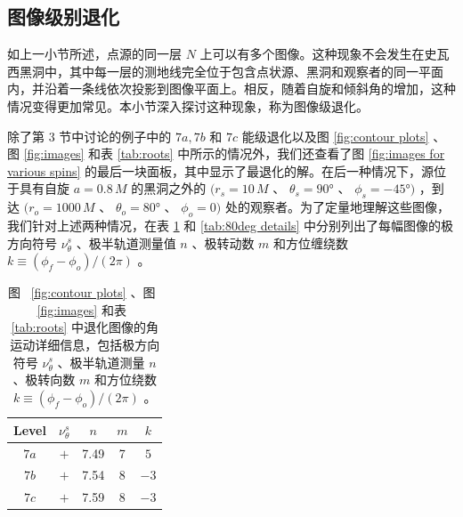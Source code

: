 \documentclass[aps,reprint,superscriptaddress,nofootinbib,floatfix,longbibliography,preprintnumbers]{revtex4-1}
\begin{document}
   \subsection{图像级别退化  }   
   \label{subsec:image degeneracy}     

如上一小节所述，点源的同一层    $N$    上可以有多个图像。这种现象不会发生在史瓦西黑洞中，其中每一层的测地线完全位于包含点状源、黑洞和观察者的同一平面内，并沿着一条线依次投影到图像平面上。相反，随着自旋和倾斜角的增加，这种情况变得更加常见。本小节深入探讨这种现象，称为图像级退化。  

除了第 3 节中讨论的例子中的    $7a, 7b$    和    $7c$    能级退化以及图    \ref{fig:contour plots}   、图    \ref{fig:images}    和表    \ref{tab:roots}    中所示的情况外，我们还查看了图    \ref{fig:images for various spins}    的最后一块面板，其中显示了最退化的解。在后一种情况下，源位于具有自旋    $a = 0.8\,M$    的黑洞之外的    $(r_s = 10\,M$   、   $\theta_s = \ang{90}$   、   $\phi_s = -\ang{45})$   ，到达    $(r_o = 1000\,M$   、   $\theta_o = \ang{80}$   、   $\phi_o = 0)$    处的观察者。为了定量地理解这些图像，我们针对上述两种情况，在表    \ref{tab:7abc details}    和    \ref{tab:80deg details}    中分别列出了每幅图像的极方向符号    $\nu_{\theta}^s$   、极半轨道测量值    $n$   、极转动数    $m$    和方位缠绕数    $k \equiv (\phi_f - \phi_o)/(2\pi)$   。  

   \begin{table}[!htbp]
\renewcommand\arraystretch{1.2} 
\setlength\tabcolsep{7pt} 
\centering
\begin{tabular}{ccccc}\hline\hline
Level &         $\nu_{\theta}^s$         &         $n$         &         $m$         &         $k$          \\  \hline
        $7a$         &         $+$         & 7.49 & 7 &         $5$          \\ 
        $7b$         &         $+$         & 7.54 & 8 &         $-3$          \\ 
        $7c$         &         $+$         & 7.59 & 8 &         $-3$          \\  \hline
\end{tabular}
\caption{图~    \ref{fig:contour plots}   、图~    \ref{fig:images}    和表~    \ref{tab:roots}    中退化图像的角运动详细信息，包括极方向符号    $\nu_\theta^s$   、极半轨道测量    $n$   、极转向数    $m$    和方位绕数    $k \equiv (\phi_f - \phi_o)/(2\pi)$   。  }
\label{tab:7abc details}
\end{table}     
\end{document}
